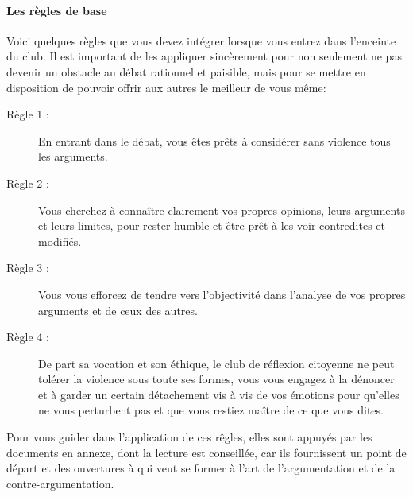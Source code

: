 \documentclass[a4paper,11pt]{article}
\begin{document}
\paragraph{Les règles de base}
Voici quelques règles que vous devez intégrer lorsque vous entrez dans l'enceinte du club. Il est important de les appliquer sincèrement pour non seulement ne pas devenir un obstacle au débat rationnel et paisible, mais pour se mettre en disposition de pouvoir offrir aux autres le meilleur de vous même:
\begin{description}
 \item[Règle 1 :] En entrant dans le débat, vous êtes prêts à considérer sans violence tous les arguments.
 \item[Règle 2 :] Vous cherchez à connaître clairement vos propres opinions, leurs arguments et leurs limites, pour rester humble et être prêt à les voir contredites et modifiés.
 \item[Règle 3 :] Vous vous efforcez de tendre vers l'objectivité dans l'analyse de vos propres arguments et de ceux des autres.
 \item[Règle 4 :] De part sa vocation et son éthique, le club de réflexion citoyenne ne peut tolérer la violence sous toute ses formes, vous vous engagez à la dénoncer et à garder un certain détachement vis à vis de vos émotions pour qu'elles ne vous perturbent pas et que vous restiez maître de ce que vous dites.
\end{description}
Pour vous guider dans l'application de ces rêgles, elles sont appuyés par les documents en annexe, dont la lecture est conseillée, car ils fournissent un point de départ et des ouvertures à qui veut se former à l'art de l'argumentation et de la contre-argumentation. 
\end{document}
